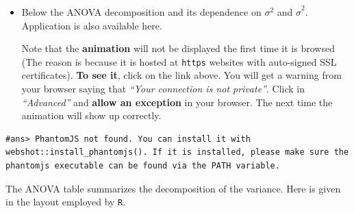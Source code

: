 \documentclass[]{book}
\newenvironment{rmdblock}[1]
  {\begin{shaded*}
  \begin{itemize}
  \renewcommand{\labelitemi}{
    \raisebox{-.7\height}[0pt][0pt]{
      {\setkeys{Gin}{width=2em,keepaspectratio}\texttt{[image: img/icons/\#1]}}
    }
  }
  \item
  }
  {
  \end{itemize}
  \end{shaded*}
  }
\newenvironment{rmdinsight}
  {\begin{rmdblock}{insight}}
  {\end{rmdblock}}
\theoremstyle{definition}
\theoremstyle{definition}
\theoremstyle{definition}
\theoremstyle{remark}
\begin{document}
\begin{rmdinsight}
Below the ANOVA decomposition and its dependence on \(\sigma^2\) and
\(\hat\sigma^2\). Application is also available here.

Note that the \textbf{animation} will not be displayed the first time it
is browsed (The reason is because it is hosted at \texttt{https}
websites with auto-signed SSL certificates). \textbf{To see it}, click
on the link above. You will get a warning from your browser saying that
\emph{``Your connection is not private''}. Click in \emph{``Advanced''}
and \textbf{allow an exception} in your browser. The next time the
animation will show up correctly.
\end{rmdinsight}

\begin{verbatim}
#ans> PhantomJS not found. You can install it with webshot::install_phantomjs(). If it is installed, please make sure the phantomjs executable can be found via the PATH variable.
\end{verbatim}

The ANOVA table summarizes the decomposition of the variance. Here is
given in the layout employed by \texttt{R}.
\end{document}
